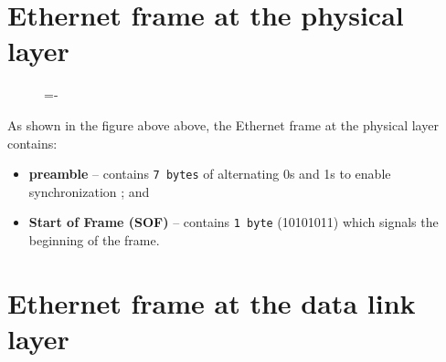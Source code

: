 \documentclass[a4paper]{systems-software}
\begin{document}
\section*{Ethernet frame at the physical layer}

\begin{figure}[H]
	\lineskip=-\fboxrule
\end{figure}

As shown in the figure above above, the Ethernet frame at the physical layer contains:
\begin{itemize}
	\item \textbf{preamble} -- contains \texttt{7 bytes} of alternating 0s and 1s to enable synchronization  ; and
	\item \textbf{Start of Frame (SOF)} -- contains \texttt{1 byte} (10101011) which signals the beginning of the frame.
\end{itemize}


\section*{Ethernet frame at the data link layer}
\end{document}
